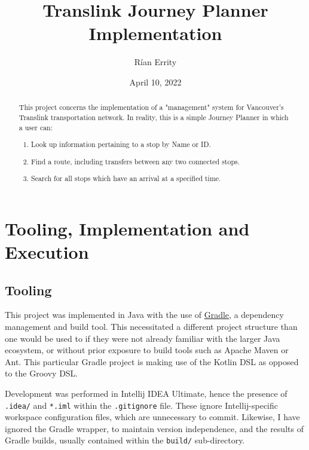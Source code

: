 \documentclass[12pt]{report}
\begin{document}
	
	\title{Translink Journey Planner Implementation}   %
	\author{Rían Errity}         %
	\date{April 10, 2022}    %
	\maketitle
	
	\begin{abstract}
		This project concerns the implementation of a "management" system for Vancouver's Translink transportation network.
		In reality, this is a simple Journey Planner in which a user can:
		 \begin{enumerate}
		 	\item Look up information pertaining to a stop by Name or ID.
		 	\item Find a route, including transfers between any two connected stops.
		 	\item Search for all stops which have an arrival at a specified time. 
		 \end{enumerate}
	\end{abstract}
	
	\chapter{Tooling, Implementation and Execution}
	\section{Tooling}
	
	This project was implemented in Java with the use of \href{https://gradle.org}{Gradle}, a dependency management and build tool. This necessitated a different project structure than one would be used to if they were not already familiar with the larger Java ecosystem, or without prior exposure to build tools such as Apache Maven or Ant. This particular Gradle project is making use of the Kotlin DSL as opposed to the Groovy DSL. \newline

	 Development was performed in Intellij IDEA Ultimate, hence the presence of \texttt{.idea/} and \texttt{*.iml} within the \texttt{.gitignore} file. These ignore Intellij-specific workspace configuration files, which are unnecessary to commit. Likewise, I have ignored the Gradle wrapper, to maintain version independence, and the results of Gradle builds, usually contained within the \texttt{build/} sub-directory. 
	
\end{document}
